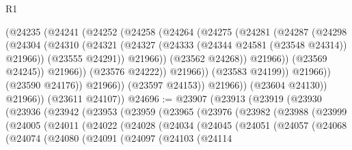 \begin{lexlean}{R1}
\begin{coremodule}
                              (@24235
                                (@24241
                                  (@24252
                                    (@24258
                                      (@24264
                                        (@24275
                                          (@24281
                                            (@24287
                                              (@24298
                                                (@24304
                                                  (@24310
                                                    (@24321
                                                      (@24327
                                                        (@24333
                                                          (@24344 @24581 (@23548 @24314))
                                                          @21966))
                                                      (@23555 @24291))
                                                    @21966))
                                                (@23562 @24268))
                                              @21966))
                                          (@23569 @24245))
                                        @21966))
                                    (@23576 @24222))
                                  @21966))
                              (@23583 @24199))
                            @21966))
                        (@23590 @24176))
                      @21966))
                  (@23597 @24153))
                @21966))
            (@23604 @24130))
          @21966))
      (@23611 @24107))
@24696 := @23907
    (@23913
      (@23919
        (@23930
          (@23936
            (@23942
              (@23953
                (@23959
                  (@23965
                    (@23976
                      (@23982
                        (@23988
                          (@23999
                            (@24005
                              (@24011
                                (@24022
                                  (@24028
                                    (@24034
                                      (@24045
                                        (@24051
                                          (@24057
                                            (@24068
                                              (@24074
                                                (@24080
                                                  (@24091
                                                    (@24097
                                                      (@24103
                                                        (@24114

\end{coremodule}
\end{lexlean}

